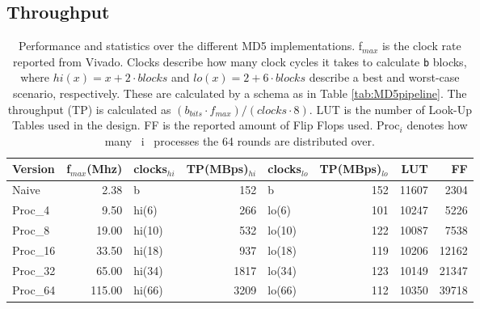 \documentclass[a4paper, openany]{book}
\begin{document}
\subsection{Throughput}
\label{sec:org654f8a6}
\begin{table}[!htb]
\centering
\captionsetup{width=.8\linewidth}
\begin{tabular}{l r l r l r r r}
\hline
Version & f$_{max}$(Mhz) & clocks$_{hi}$ & TP(MBps)$_{hi}$ &clocks$_{lo}$ & TP(MBps)$_{lo}$ & LUT & FF\\
\hline
Naive     & 2.38   & b      & 152 & b     & 152 & 11607 & 2304\\
Proc_{4}  & 9.50   & hi(6)  & 266 & lo(6) & 101 & 10247 & 5226\\
Proc_{8}  & 19.00  & hi(10) & 532 & lo(10)& 122 & 10087 & 7538\\
Proc_{16} & 33.50  & hi(18) & 937 & lo(18)& 119 & 10206 & 12162\\
Proc_{32} & 65.00  & hi(34) & 1817& lo(34)& 123 & 10149 & 21347\\
Proc_{64} & 115.00 & hi(66) & 3209& lo(66)&112 &  10350 & 39718\\
\end{tabular}
\caption[MD5: FPGA Versions]%
{Performance and statistics over the different MD5 implementations. f$_{max}$ is the clock rate reported from Vivado. Clocks describe how many clock cycles it takes to calculate \texttt{b} blocks, where $hi(x) = x+2 \cdot blocks$ and $lo(x) = 2 + 6 \cdot blocks$ describe a best and worst-case scenario, respectively. These are calculated by a schema as in Table \ref{tab:MD5pipeline}. The throughput (TP) is calculated as \((b_{bits}\cdot f_{max})/(clocks \cdot 8)\). LUT is the number of Look-Up Tables used in the design. FF is the reported amount of Flip Flops used. Proc$_{i}$ denotes how many ~i~ processes the 64 rounds are distributed over.}
\label{tab:MD5versions}
\end{table}
\end{document}

